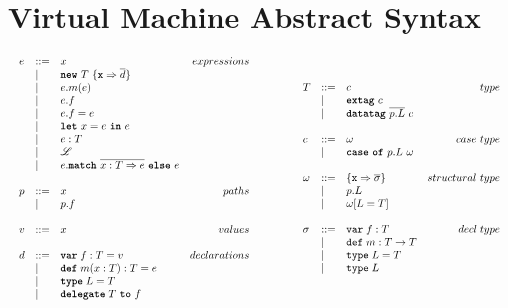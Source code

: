 \documentclass{article}
\newcommand{\keyw}[1]{\texttt{\textbf{#1}}}
\begin{document}
\section{Virtual Machine Abstract Syntax}

\[
\begin{array}{lll}
\begin{array}{lllr}
e & ::= & x & expressions \\
& | & \keyw{new}~T~\{\keyw{x} \Rightarrow \overline{d}\}&\\
& | & e.m(e) &\\
& | & e.f &\\
& | & e.f = e&\\
& | & \keyw{let}~x=e~\keyw{in}~e &\\
& | & e : T&\\
& | & \mathscr{L} &\\
& | & e.\keyw{match}~\overline{x:T \Rightarrow e}~\keyw{else}~e &\\
&&\\
p & ::= & x & paths \\
& | & p.f &\\
&&\\
v & ::= & x & values \\
&&\\
d & ::= & \keyw{var} \; f : T = v & declarations \\
  & |   & \keyw{def} \; m(x:T) : T = e &\\
  & |   & \keyw{type} \; L = T &\\
  & |   & \keyw{delegate} \; T~\keyw{to}~f &\\
&&\\
\end{array}
& ~~~~~~
&
\begin{array}{lllr}
T & ::= & c & type \\
& | & \keyw{extag}~c &\\
& | & \keyw{datatag}~\overline{p.L}~c &\\
&&\\
c & ::= & \omega & case ~ type \\
& | & \keyw{case}~\keyw{of}~p.L~\omega &\\
&&\\
\omega & ::= & \{\texttt{x} \Rightarrow \overline{\sigma}\} & structural~type \\
& | & p.L &\\
& | & \omega[L=T] &\\
&&\\
\sigma & ::= & \texttt{var} \; f:T & decl \; type\\
       & |   & \texttt{def} \; m:T \rightarrow T \\
       & |   & \texttt{type} \; L = T &\\
       & |   & \texttt{type} \; L &\\
&&\\
\end{array}
\end{array}
\]






\end{document}
